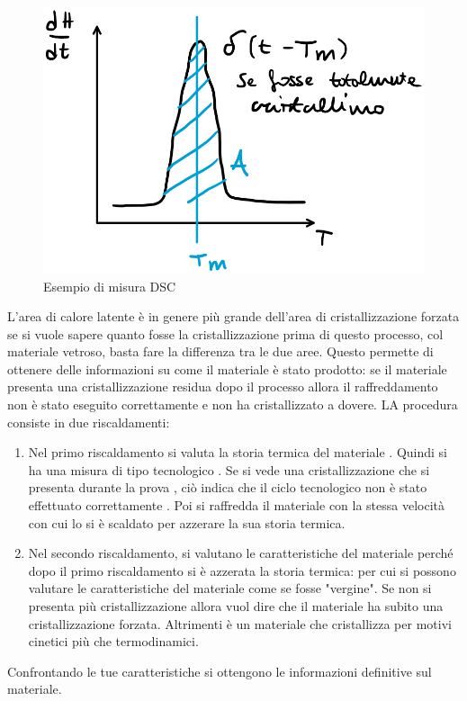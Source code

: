 \begin{figure}
\centering
\includegraphics[width = \textwidth]{gfx/DSC}
\caption{Esempio di misura DSC}
\label{fig:DSC}
\end{figure}

L'area di calore latente è in genere più grande dell'area di cristallizzazione forzata se si vuole sapere quanto fosse la cristallizzazione prima di questo processo, col materiale vetroso, basta fare la differenza tra le due aree.
Questo permette di ottenere delle informazioni su come il materiale è stato prodotto: se il materiale presenta una cristallizzazione residua dopo il processo allora il raffreddamento non è stato eseguito correttamente e non ha cristallizzato a dovere.
LA procedura consiste in due riscaldamenti:
\begin{enumerate}
\item Nel primo riscaldamento si valuta la storia termica del materiale . Quindi si ha una misura di tipo tecnologico . Se si vede una cristallizzazione che si presenta durante la prova , ciò indica che il ciclo tecnologico non è stato effettuato correttamente . Poi si raffredda il materiale con la stessa velocità con cui lo si è scaldato per azzerare la sua storia termica.
\item Nel secondo riscaldamento, si valutano le caratteristiche del materiale perché dopo il primo riscaldamento si è azzerata la storia termica: per cui si possono valutare le caratteristiche del materiale come se fosse "vergine". Se non si presenta più cristallizzazione allora vuol dire che il materiale ha subito una cristallizzazione forzata. Altrimenti è un materiale che cristallizza per motivi cinetici più che termodinamici.
\end{enumerate}
Confrontando le tue caratteristiche si ottengono le informazioni definitive sul materiale.